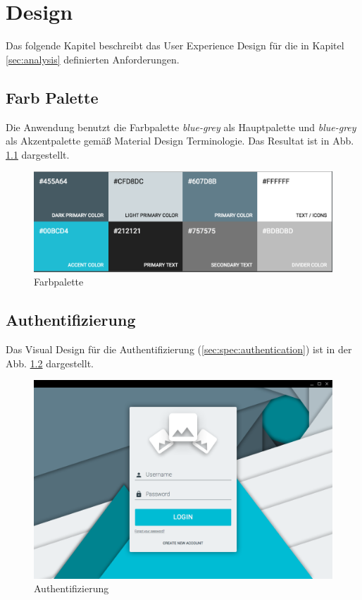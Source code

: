 \chapter{Design}

Das folgende Kapitel beschreibt das User Experience Design für die in Kapitel \ref{sec:analysis} definierten Anforderungen.

\section{Farb Palette}

Die Anwendung benutzt die Farbpalette \textit{blue-grey} als Hauptpalette und \textit{blue-grey} als Akzentpalette gemäß Material Design Terminologie. Das Resultat ist in Abb. \ref{fig:color_palette} dargestellt.

\begin{figure}[htp]     %
\centering
\includegraphics[width=1.0\textwidth]{images/color_palette}
\caption{Farbpalette}\label{fig:color_palette}
\end{figure}

\section{Authentifizierung}

Das Visual Design für die Authentifizierung (\ref{sec:spec:authentication}) ist in der Abb. \ref{fig:login_form} dargestellt.

\begin{figure}[htp]     %
\centering
\includegraphics[width=1.0\textwidth]{images/login_form}
\caption{Authentifizierung}\label{fig:login_form}
\end{figure}

